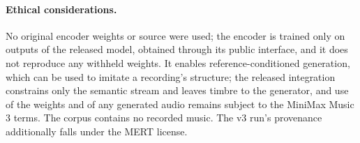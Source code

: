 \paragraph{Ethical considerations.} No original encoder weights or source were used; the encoder is trained only on outputs of the released model, obtained through its public interface, and it does not reproduce any withheld weights. It enables reference-conditioned generation, which can be used to imitate a recording's structure; the released integration constrains only the semantic stream and leaves timbre to the generator, and use of the weights and of any generated audio remains subject to the MiniMax Music 3 terms. The corpus contains no recorded music. The v3 run's provenance additionally falls under the MERT license.
